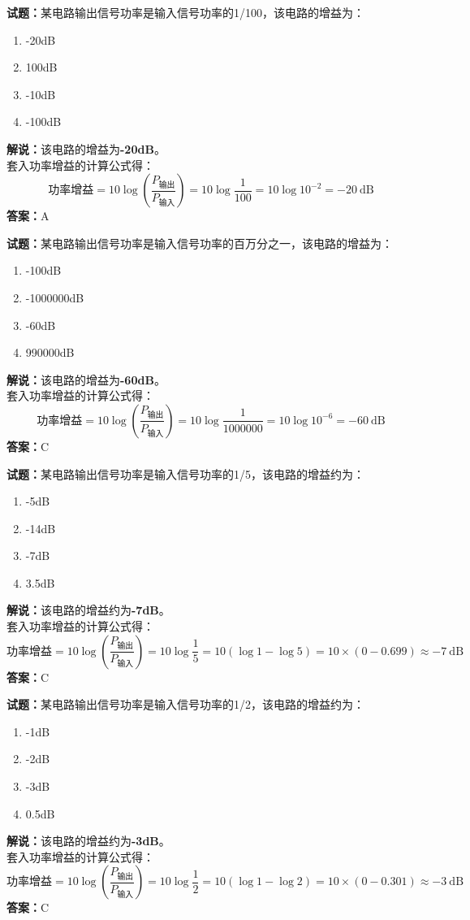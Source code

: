 \documentclass{ctexbook}
\begin{document}
\bigskip

\noindent\textbf{试题：}某电路输出信号功率是输入信号功率的1/100，该电路的增益为：
\begin{enumerate}[leftmargin=3em]
  \item -20dB
  \item 100dB
  \item -10dB
  \item -100dB
\end{enumerate}
\noindent\textbf{解说：}该电路的增益为\textbf{-20dB}。\\
套入功率增益的计算公式得：
$$\mbox{功率增益}=10 \log \left( {\frac{P_{ \mbox{输出} }}{P_{ \mbox{输入} }}} \right)=10 \log \frac{1}{100}=10 \log 10^{-2}=-20 \ \mathrm{dB}$$
\noindent\textbf{答案：}A

\bigskip

\noindent\textbf{试题：}某电路输出信号功率是输入信号功率的百万分之一，该电路的增益为：
\begin{enumerate}[leftmargin=3em]
  \item -100dB
  \item -1000000dB
  \item -60dB
  \item 990000dB
\end{enumerate}
\noindent\textbf{解说：}该电路的增益为\textbf{-60dB}。\\
套入功率增益的计算公式得：
$$\mbox{功率增益}=10 \log \left( {\frac{P_{ \mbox{输出} }}{P_{ \mbox{输入} }}} \right)=10 \log \frac{1}{1000000}=10 \log 10^{-6}=-60 \ \mathrm{dB}$$
\noindent\textbf{答案：}C

\bigskip

\noindent\textbf{试题：}某电路输出信号功率是输入信号功率的1/5，该电路的增益约为：
\begin{enumerate}[leftmargin=3em]
  \item -5dB
  \item -14dB
  \item -7dB
  \item 3.5dB
\end{enumerate}
\noindent\textbf{解说：}该电路的增益约为\textbf{-7dB}。\\
套入功率增益的计算公式得：
$$\mbox{功率增益}=10 \log \left( {\frac{P_{ \mbox{输出} }}{P_{ \mbox{输入} }}} \right)=10 \log \frac{1}{5}=10 \left( \log 1 - \log 5 \right) = 10 \times \left( 0 - 0.699 \right) \approx -7 \ \mathrm{dB}$$
\noindent\textbf{答案：}C

\bigskip

\noindent\textbf{试题：}某电路输出信号功率是输入信号功率的1/2，该电路的增益约为：
\begin{enumerate}[leftmargin=3em]
  \item -1dB
  \item -2dB
  \item -3dB
  \item 0.5dB
\end{enumerate}
\noindent\textbf{解说：}该电路的增益约为\textbf{-3dB}。\\
套入功率增益的计算公式得：
$$\mbox{功率增益}=10 \log \left( {\frac{P_{ \mbox{输出} }}{P_{ \mbox{输入} }}} \right)=10 \log \frac{1}{2}=10 \left( \log 1 - \log 2 \right) = 10 \times \left( 0 - 0.301 \right) \approx -3 \ \mathrm{dB}$$
\noindent\textbf{答案：}C
\end{document}
